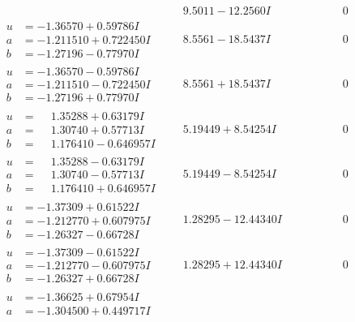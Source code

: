 \documentclass[1p]{elsarticle_modified}
\theoremstyle{definition}
\begin{document}
$$\begin{array}{c|c|c}
 & \phantom{-}9.5011 - 12.2560 I & \phantom{-0.000000 } 0 \\ \hline\begin{aligned}
u &= -1.36570 + 0.59786 I \\
a &= -1.211510 + 0.722450 I \\
b &= -1.27196 - 0.77970 I\end{aligned}
 & \phantom{-}8.5561 - 18.5437 I & \phantom{-0.000000 } 0 \\ \hline\begin{aligned}
u &= -1.36570 - 0.59786 I \\
a &= -1.211510 - 0.722450 I \\
b &= -1.27196 + 0.77970 I\end{aligned}
 & \phantom{-}8.5561 + 18.5437 I & \phantom{-0.000000 } 0 \\ \hline\begin{aligned}
u &= \phantom{-}1.35288 + 0.63179 I \\
a &= \phantom{-}1.30740 + 0.57713 I \\
b &= \phantom{-}1.176410 - 0.646957 I\end{aligned}
 & \phantom{-}5.19449 + 8.54254 I & \phantom{-0.000000 } 0 \\ \hline\begin{aligned}
u &= \phantom{-}1.35288 - 0.63179 I \\
a &= \phantom{-}1.30740 - 0.57713 I \\
b &= \phantom{-}1.176410 + 0.646957 I\end{aligned}
 & \phantom{-}5.19449 - 8.54254 I & \phantom{-0.000000 } 0 \\ \hline\begin{aligned}
u &= -1.37309 + 0.61522 I \\
a &= -1.212770 + 0.607975 I \\
b &= -1.26327 - 0.66728 I\end{aligned}
 & \phantom{-}1.28295 - 12.44340 I & \phantom{-0.000000 } 0 \\ \hline\begin{aligned}
u &= -1.37309 - 0.61522 I \\
a &= -1.212770 - 0.607975 I \\
b &= -1.26327 + 0.66728 I\end{aligned}
 & \phantom{-}1.28295 + 12.44340 I & \phantom{-0.000000 } 0 \\ \hline\begin{aligned}
u &= -1.36625 + 0.67954 I \\
a &= -1.304500 + 0.449717 I \\

\end{aligned}
\end{array}$$
\end{document}
